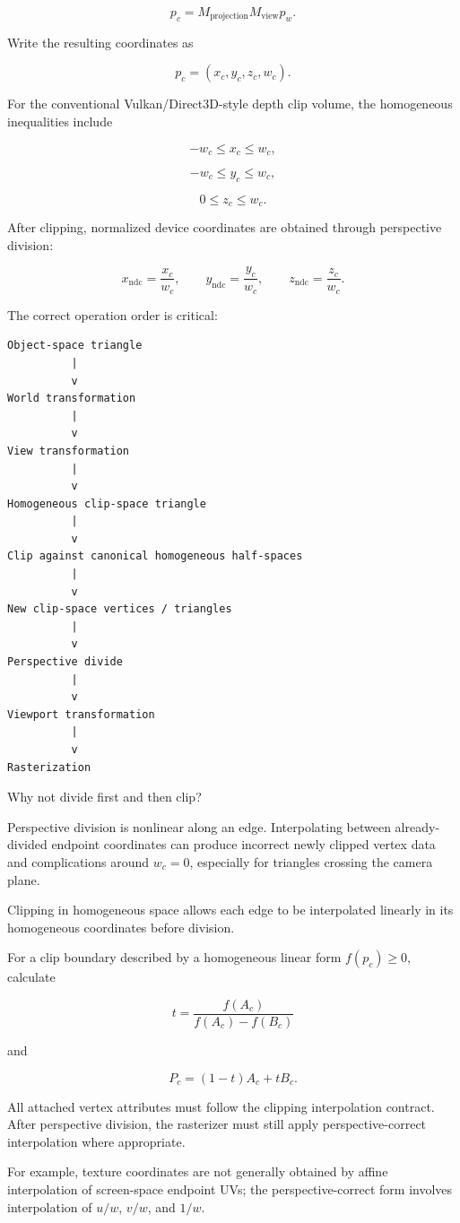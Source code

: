 \[
p_c=M_{\text{projection}}M_{\text{view}}p_w.
\]

Write the resulting coordinates as

\[
p_c=(x_c,y_c,z_c,w_c).
\]

For the conventional Vulkan/Direct3D-style depth clip volume, the homogeneous inequalities include

\[
-w_c\le x_c\le w_c,
\]

\[
-w_c\le y_c\le w_c,
\]

\[
0\le z_c\le w_c.
\]

After clipping, normalized device coordinates are obtained through perspective division:

\[
x_{\text{ndc}}=\frac{x_c}{w_c},\qquad y_{\text{ndc}}=\frac{y_c}{w_c},\qquad z_{\text{ndc}}=\frac{z_c}{w_c}.
\]

The correct operation order is critical:

\begin{verbatim}
Object-space triangle
          |
          v
World transformation
          |
          v
View transformation
          |
          v
Homogeneous clip-space triangle
          |
          v
Clip against canonical homogeneous half-spaces
          |
          v
New clip-space vertices / triangles
          |
          v
Perspective divide
          |
          v
Viewport transformation
          |
          v
Rasterization
\end{verbatim}

Why not divide first and then clip?

Perspective division is nonlinear along an edge. Interpolating between already-divided endpoint coordinates can produce incorrect newly clipped vertex data and complications around \(w_c=0\), especially for triangles crossing the camera plane.

Clipping in homogeneous space allows each edge to be interpolated linearly in its homogeneous coordinates before division.

For a clip boundary described by a homogeneous linear form \(f(p_c)\ge0\), calculate

\[
t=\frac{f(A_c)}{f(A_c)-f(B_c)}
\]

and

\[
P_c=(1-t)A_c+tB_c.
\]

All attached vertex attributes must follow the clipping interpolation contract. After perspective division, the rasterizer must still apply perspective-correct interpolation where appropriate.

For example, texture coordinates are not generally obtained by affine interpolation of screen-space endpoint UVs; the perspective-correct form involves interpolation of \(u/w\), \(v/w\), and \(1/w\).

